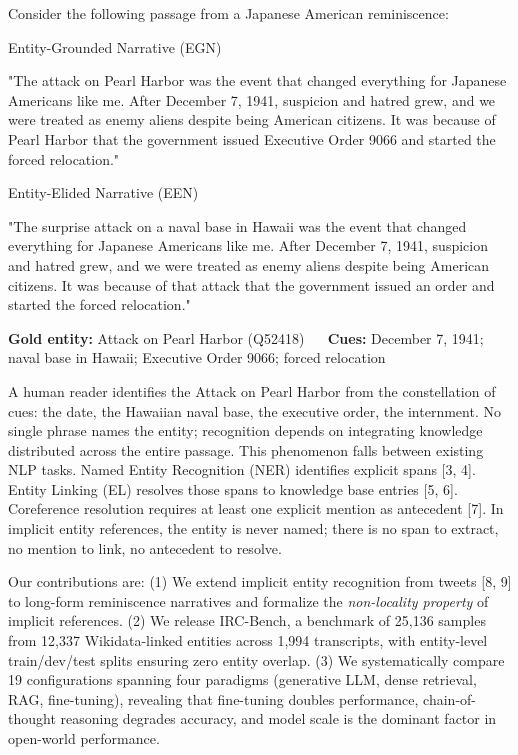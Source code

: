 \documentclass[
]{article}
\begin{document}
Consider the following passage from a Japanese American reminiscence:

Entity-Grounded Narrative (EGN)

"The attack on Pearl Harbor was the event that changed everything for
Japanese Americans like me. After December 7, 1941, suspicion and hatred
grew, and we were treated as enemy aliens despite being American
citizens. It was because of Pearl Harbor that the government issued
Executive Order 9066 and started the forced relocation."

Entity-Elided Narrative (EEN)

"The surprise attack on a naval base in Hawaii was the event that
changed everything for Japanese Americans like me. After December 7,
1941, suspicion and hatred grew, and we were treated as enemy aliens
despite being American citizens. It was because of that attack that the
government issued an order and started the forced relocation."

\textbf{Gold entity:} Attack on Pearl Harbor (Q52418) ~\textbar~
\textbf{Cues:} December 7, 1941; naval base in Hawaii; Executive Order
9066; forced relocation

A human reader identifies the Attack on Pearl Harbor from the
constellation of cues: the date, the Hawaiian naval base, the executive
order, the internment. No single phrase names the entity; recognition
depends on integrating knowledge distributed across the entire passage.
This phenomenon falls between existing NLP tasks. Named Entity
Recognition (NER) identifies explicit spans {[}3, 4{]}. Entity Linking
(EL) resolves those spans to knowledge base entries {[}5, 6{]}.
Coreference resolution requires at least one explicit mention as
antecedent {[}7{]}. In implicit entity references, the entity is never
named; there is no span to extract, no mention to link, no antecedent to
resolve.

Our contributions are: (1) We extend implicit entity recognition from
tweets {[}8, 9{]} to long-form reminiscence narratives and formalize the
\emph{non-locality property} of implicit references. (2) We release
IRC-Bench, a benchmark of 25,136 samples from 12,337 Wikidata-linked
entities across 1,994 transcripts, with entity-level train/dev/test
splits ensuring zero entity overlap. (3) We systematically compare 19
configurations spanning four paradigms (generative LLM, dense retrieval,
RAG, fine-tuning), revealing that fine-tuning doubles performance,
chain-of-thought reasoning degrades accuracy, and model scale is the
dominant factor in open-world performance.
\end{document}
